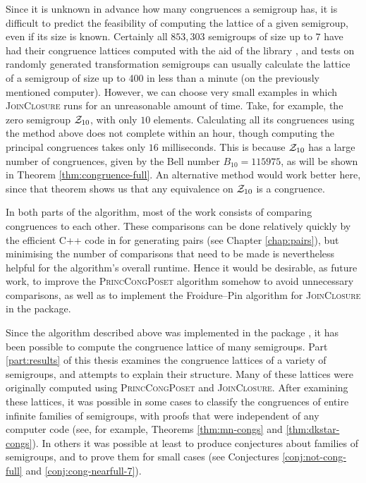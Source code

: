 Since it is unknown in advance how many congruences a semigroup has, it is
difficult to predict the feasibility of computing the lattice of a given
semigroup, even if its size is known.  Certainly all $853,303$ semigroups of
size up to $7$ have had their congruence lattices computed with the aid of the
\smallsemi{} library \cite{smallsemi}, and tests on randomly generated
transformation semigroups can usually calculate the lattice of a semigroup of
size up to 400 in less than a minute (on the previously mentioned computer).
However, we can choose very small examples in which \textsc{JoinClosure} runs
for an unreasonable amount of time.  Take, for example, the zero semigroup
$\mathcal{Z}_{10}$, with only $10$ elements.  Calculating all its congruences using the
method above does not complete within an hour, though computing the principal
congruences takes only $16$ milliseconds.  This is because $\mathcal{Z}_{10}$ has a large
number of congruences, given by the Bell number $B_{10} = 115975$, as will be
shown in Theorem \ref{thm:congruence-full}.  An alternative method would work
better here, since that theorem shows us that any equivalence on $\mathcal{Z}_{10}$ is a
congruence.

In both parts of the algorithm, most of the work consists of comparing
congruences to each other.  These comparisons can be done relatively quickly by
the efficient C++ code in \libsemigroups{} for generating pairs (see
Chapter \ref{chap:pairs}), but minimising the number of comparisons that need to
be made is nevertheless helpful for the algorithm's overall runtime.  Hence it
would be desirable, as future work, to improve the \textsc{PrincCongPoset}
algorithm somehow to avoid unnecessary comparisons, as well as to implement the
Froidure--Pin algorithm for \textsc{JoinClosure} in the \Semigroups{} package.

Since the algorithm described above was implemented in the \Semigroups{} package
\cite{semigroups}, it has been possible to compute the congruence lattice of
many semigroups.  Part \ref{part:results} of this thesis examines
the congruence lattices of a variety of semigroups, and attempts to explain
their structure.  Many of these lattices were originally computed using
\textsc{PrincCongPoset} and \textsc{JoinClosure}.  After examining these
lattices, it was possible in some cases to classify the congruences of entire
infinite families of semigroups, with proofs that were independent of any
computer code (see, for example, Theorems \ref{thm:mn-congs} and
\ref{thm:dkstar-congs}).  In others it was possible at least to produce
conjectures about families of semigroups, and to prove them for small cases (see
Conjectures \ref{conj:not-cong-full} and \ref{conj:cong-nearfull-7}).
